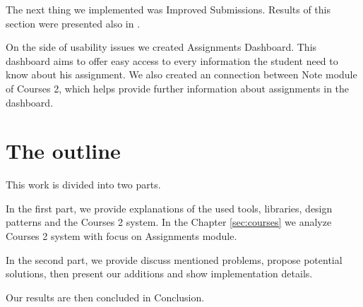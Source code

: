 The next thing we implemented was Improved Submissions. Results of this section were presented also in \cite{peerreview}.

On the side of usability issues we created Assignments Dashboard. This dashboard aims to offer easy access to every information the student need to know about his assignment. We also created an connection between Note module of Courses 2, which helps provide further information about assignments in the dashboard.


\section*{The outline}
This work is divided into two parts.

In the first part, we provide explanations of the used tools, libraries, design patterns and the Courses 2 system. In the Chapter \ref{sec:courses} we analyze Courses 2 system with focus on Assignments module.


In the second part, we provide discuss mentioned problems, propose potential solutions, then present our additions and show implementation details.


Our results are then concluded in Conclusion.
